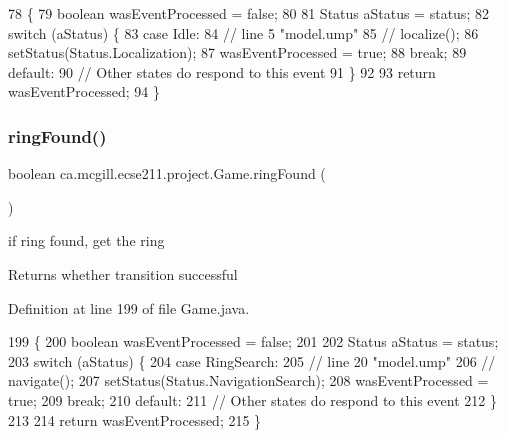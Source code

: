 \begin{DoxyCode}
78                          \{
79     \textcolor{keywordtype}{boolean} wasEventProcessed = \textcolor{keyword}{false};
80 
81     Status aStatus = status;
82     \textcolor{keywordflow}{switch} (aStatus) \{
83       \textcolor{keywordflow}{case} Idle:
84         \textcolor{comment}{// line 5 "model.ump"}
85         \textcolor{comment}{// localize();}
86         setStatus(Status.Localization);
87         wasEventProcessed = \textcolor{keyword}{true};
88         \textcolor{keywordflow}{break};
89       \textcolor{keywordflow}{default}:
90         \textcolor{comment}{// Other states do respond to this event}
91     \}
92 
93     \textcolor{keywordflow}{return} wasEventProcessed;
94   \}
\end{DoxyCode}
\mbox{\label{enumca_1_1mcgill_1_1ecse211_1_1project_1_1_game_a62d510506f1b829fe67dea7270e5b889}} 
\subsubsection{\texorpdfstring{ring\+Found()}{ringFound()}}
{\footnotesize\ttfamily boolean ca.\+mcgill.\+ecse211.\+project.\+Game.\+ring\+Found (\begin{DoxyParamCaption}{ }\end{DoxyParamCaption})}

if ring found, get the ring

\begin{DoxyReturn}{Returns}
whether transition successful 
\end{DoxyReturn}


Definition at line 199 of file Game.\+java.


\begin{DoxyCode}
199                              \{
200     \textcolor{keywordtype}{boolean} wasEventProcessed = \textcolor{keyword}{false};
201 
202     Status aStatus = status;
203     \textcolor{keywordflow}{switch} (aStatus) \{
204       \textcolor{keywordflow}{case} RingSearch:
205         \textcolor{comment}{// line 20 "model.ump"}
206         \textcolor{comment}{// navigate();}
207         setStatus(Status.NavigationSearch);
208         wasEventProcessed = \textcolor{keyword}{true};
209         \textcolor{keywordflow}{break};
210       \textcolor{keywordflow}{default}:
211         \textcolor{comment}{// Other states do respond to this event}
212     \}
213 
214     \textcolor{keywordflow}{return} wasEventProcessed;
215   \}
\end{DoxyCode}
\mbox{\label{enumca_1_1mcgill_1_1ecse211_1_1project_1_1_game_adc2725f291b0688a62f85db1df1ee2b2}} 
